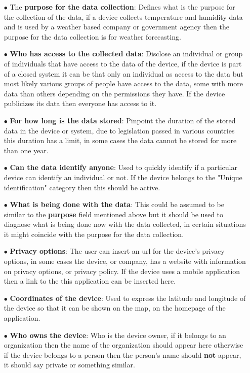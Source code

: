 \begin{itemize}
\begin{itemize}
    \end{itemize}
    \item[$\bullet$]
    The \textbf{purpose for the data collection}: Defines what is the purpose for the collection of the data, if a device collects temperature and humidity data and is used by a weather based company or government agency then the purpose for the data collection is for weather forecasting.
    \item[$\bullet$]
    \textbf{Who has access to the collected data}: Disclose an individual or group of individuals that have access to the data of the device, if the device is part of a closed system it can be that only an individual as access to the data but most likely various groups of people have access to the data, some with more data than others depending on the permissions they have. If the device publicizes its data then everyone has access to it.
    \item[$\bullet$]
    \textbf{For how long is the data stored}: Pinpoint the duration of the stored data in the device or system, due to legislation passed in various countries this duration has a limit, in some cases the data cannot be stored for more than one year.
    \item[$\bullet$]
    \textbf{Can the data identify anyone}: Used to quickly identify if a particular device can identify an individual or not. If the device belongs to the "Unique identification" category then this should be active.
    \item[$\bullet$]
    \textbf{What is being done with the data}: This could be assumed to be similar to the \textbf{purpose} field mentioned above but it should be used to diagnose what is being done now with the data collected, in certain situations it might coincide with the purpose for the data collection.
    \item[$\bullet$]
    \textbf{Privacy options}: The user can insert an url for the device's privacy options, in some cases the device, or company, has a website with information on privacy options, or privacy policy. If the device uses a mobile application then a link to the this application can be inserted here.
    \item[$\bullet$]
    \textbf{Coordinates of the device}: Used to express the latitude and longitude of the device so that it can be shown on the map, on the homepage of the application.
    \item[$\bullet$]
    \textbf{Who owns the device}: Who is the device owner, if it belongs to an organization then the name of the organization should appear here otherwise if the device belongs to a person then the person's name should \textbf{not} appear, it should say private or something similar.
\end{itemize}

